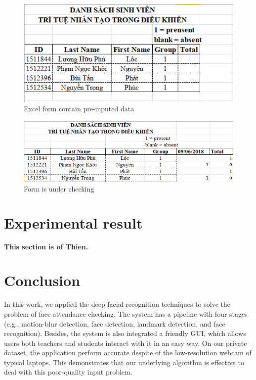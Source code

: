 \documentclass[journal, twocolumn]{IEEEtran}
\begin{document}
\begin{figure}
    \centering
    \includegraphics[width=0.8\linewidth]{img/form-data.png}
	\caption{Excel form contain pre-inputed data}\label{fig:form-data}
\end{figure}

\begin{figure}
    \centering
    \includegraphics[width=0.8\linewidth]{img/form-checked.png}
	\caption{Form is under checking}\label{fig:form-checked}
\end{figure}


\medskip
\section{Experimental result}
\label{experimental-result}
\textbf{This section is of Thien.}


\medskip
\section{Conclusion}
\label{conclusion}

In this work, we applied the deep facial recognition techniques to solve the problem of face attendance checking. The system has a pipeline with four stages (e.g., motion-blur detection, face detection, landmark detection, and face recognition). Besides, the system is also integrated a friendly GUI, which allows users both teachers and students interact with it in an easy way. On our private dataset, the application perform accurate despite of the low-resolution webcam of typical laptops. This demonstrates that our underlying algorithm is effective to deal with this poor-quality input problem.
\end{document}
